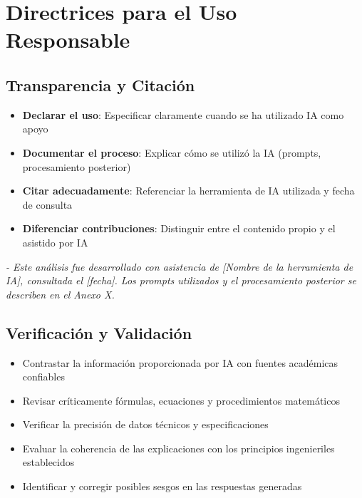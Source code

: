 \documentclass[11pt, letterpaper]{article}
\begin{document}
	\section{Directrices para el Uso Responsable}
	
	\subsection{Transparencia y Citación}
	
	\begin{itemize}
		\item \textbf{Declarar el uso}: Especificar claramente cuando se ha utilizado IA como apoyo
		\item \textbf{Documentar el proceso}: Explicar cómo se utilizó la IA (prompts, procesamiento posterior)
		\item \textbf{Citar adecuadamente}: Referenciar la herramienta de IA utilizada y fecha de consulta
		\item \textbf{Diferenciar contribuciones}: Distinguir entre el contenido propio y el asistido por IA
	\end{itemize}
	
	\begin{tcolorbox}[colback=gray!5, colframe=uteqGray, title={Ejemplo de citación}]
		\textit{- Este análisis fue desarrollado con asistencia de [Nombre de la herramienta de IA], consultada el [fecha]. Los prompts utilizados y el procesamiento posterior se describen en el Anexo X.}
	\end{tcolorbox}
	
	\subsection{Verificación y Validación}
	
	\begin{itemize}
		\item Contrastar la información proporcionada por IA con fuentes académicas confiables
		\item Revisar críticamente fórmulas, ecuaciones y procedimientos matemáticos
		\item Verificar la precisión de datos técnicos y especificaciones
		\item Evaluar la coherencia de las explicaciones con los principios ingenieriles establecidos
		\item Identificar y corregir posibles sesgos en las respuestas generadas
	\end{itemize}
	
\end{document}

